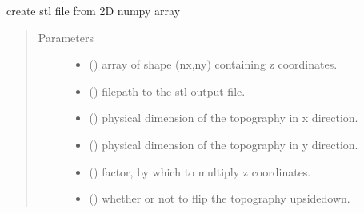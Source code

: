 \documentclass[letterpaper,10pt,english]{sphinxmanual}
\begin{document}
\begin{fulllineitems}
\label{\detokenize{stlutils:stlutils.convertArray}}
\sphinxAtStartPar
create stl file from 2D numpy array
\begin{quote}\begin{description}
\item[{Parameters}] \leavevmode\begin{itemize}
\item {} 
\sphinxAtStartPar
{} () \textendash{} array of shape (nx,ny) containing z coordinates.

\item {} 
\sphinxAtStartPar
{} () \textendash{} filepath to the stl output file.

\item {} 
\sphinxAtStartPar
{} () \textendash{} physical dimension of the topography in x direction.

\item {} 
\sphinxAtStartPar
{} () \textendash{} physical dimension of the topography in y direction.

\item {} 
\sphinxAtStartPar
{} () \textendash{} factor, by which to multiply z coordinates.

\item {} 
\sphinxAtStartPar
{} () \textendash{} whether or not to flip the topography upside\sphinxhyphen{}down.


\end{itemize}
\end{description}
\end{quote}
\end{fulllineitems}
\end{document}
